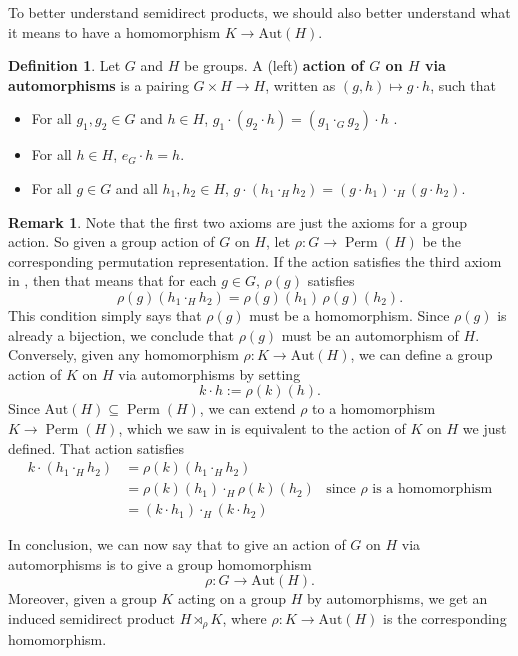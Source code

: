 \documentclass[12pt]{report}
\numberwithin{equation}{section}
\numberwithin{theorem}{chapter}
\theoremstyle{definition}
\newtheorem{definition}[theorem]{Definition}
\newtheorem*{basic properties}{Basic Properties}
\newtheorem*{Important Remark}{Important Remark}
\newtheorem{remark}[theorem]{Remark}
\DeclareMathOperator{\Perm}{Perm}
\def\sdp{\rtimes}
\begin{document}
To better understand semidirect products, we should also better understand what it means to have a homomorphism $K \to \mathrm{Aut}(H)$.


\begin{definition}\label{def action via autos}
Let $G$ and $H$ be groups. A (left) {\bf action of $G$ on $H$ via automorphisms} is a pairing $G \times H \to H$, written as $(g,h) \mapsto g \cdot h$, such that
\begin{itemize}[itemsep=-0.1em]
\item For all $g_1, g_2 \in G$ and $h \in H$, $g_1 \cdot (g_2 \cdot h) = (g_1 \cdot _G g_2) \cdot h$ .
\item For all $h \in H$, $e_G \cdot h = h$.
\item For all $g \in G$ and all $h_1, h_2 \in H$,  $g \cdot (h_1 \cdot_H h_2) = (g \cdot h_1) \cdot_H (g \cdot h_2)$.
\end{itemize} 	
\end{definition}

\begin{remark}
Note that the first two axioms are just the axioms for a group action. So given a group action of $G$ on $H$, let $\rho\!: G \to \Perm(H)$ be the corresponding permutation representation. If the action satisfies the third axiom in , then that means that for each $g \in G$, $\rho(g)$ satisfies
$$\rho(g) (h_1 \cdot_H h_2) = \rho(g)(h_1) \, \rho(g)(h_2).$$
This condition simply says that $\rho(g)$ must be a homomorphism. Since $\rho(g)$ is already a bijection, we conclude that $\rho(g)$ must be an automorphism of $H$. 
Conversely, given any homomorphism $\rho\!: K \to \mathrm{Aut}(H)$, we can define a group action of $K$ on $H$ via automorphisms by setting
$$k \cdot h := \rho(k)(h).$$
Since $\mathrm{Aut}(H) \subseteq \Perm(H)$, we can extend $\rho$ to a homomorphism $K \to \Perm(H)$, which we saw in  is equivalent to the action of $K$ on $H$ we just defined. That action satisfies
$$\begin{aligned}
k \cdot (h_1 \cdot_H h_2) & = \rho(k)(h_1 \cdot_H h_2) \\
& = \rho(k)(h_1) \cdot_H \rho(k)(h_2) & \text{since $\rho$ is a homomorphism} \\
& = (k \cdot h_1) \cdot_H (k \cdot h_2)
\end{aligned}$$


In conclusion, we can now say that to give an action of $G$ on $H$ via automorphisms is to give a group homomorphism 
$$\rho\!: G \to \mathrm{Aut}(H).$$
Moreover, given a group $K$ acting on a group $H$ by automorphisms, we get an induced semidirect product $H \sdp_\rho K$, where $\rho\!: K \to \mathrm{Aut}(H)$ is the corresponding homomorphism. 
\end{remark}
\end{document}
